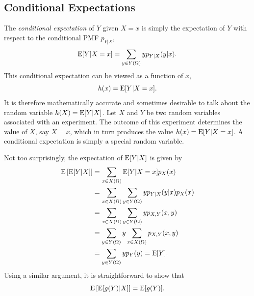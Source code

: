 \subsection{Conditional Expectations}

The \emph{conditional expectation} of $Y$ given $X = x$ is simply the expectation of $Y$ with respect to the conditional PMF $p_{Y|X}$,
\begin{equation*}
\mathrm{E} [Y | X = x ] = \sum_{y \in Y(\Omega)} y p_{Y|X} (y|x).
\end{equation*}
This conditional expectation can be viewed as a function of $x$,
\begin{equation*}
h(x) = \mathrm{E} [Y | X = x] .
\end{equation*}
It is therefore mathematically accurate and sometimes desirable to talk about the random variable $h (X) = \mathrm{E} [Y | X]$.
Let $X$ and $Y$ be two random variables associated with an experiment.
The outcome of this experiment determines the value of $X$, say $X = x$, which in turn produces the value $h(x) = \mathrm{E} [Y | X = x]$.
A conditional expectation is simply a special random variable.

Not too surprisingly, the expectation of $\mathrm{E} [Y | X]$ is given by
\begin{equation*}
\begin{split}
\mathrm{E} \left[ \mathrm{E} [Y | X] \right]
&= \sum_{x \in X(\Omega)} \mathrm{E} [Y | X = x] p_X (x) \\
&= \sum_{x \in X(\Omega)} \sum_{y \in Y(\Omega)} y p_{Y|X} (y|x) p_X (x) \\
&= \sum_{x \in X(\Omega)} \sum_{y \in Y(\Omega)} y p_{X,Y} (x, y) \\
&= \sum_{y \in Y(\Omega)} y \sum_{x \in X(\Omega)} p_{X,Y} (x, y) \\
&= \sum_{y \in Y(\Omega)} y p_{Y} (y)
= \mathrm{E} [Y] .
\end{split}
\end{equation*}
Using a similar argument, it is straightforward to show that
\begin{equation*}
\mathrm{E} \left[ \mathrm{E} [g (Y) | X] \right] = \mathrm{E} [g(Y)] .
\end{equation*}

